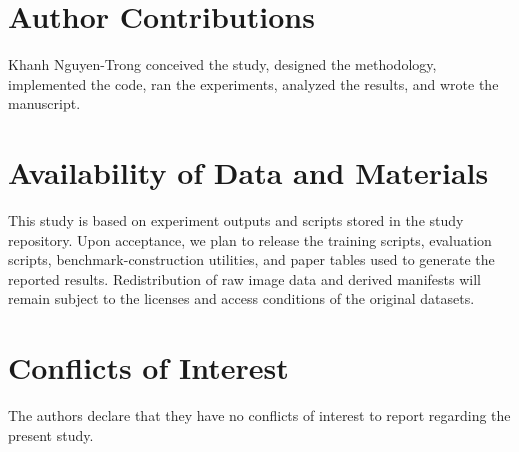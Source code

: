 \documentclass[10pt,a4paper]{article}
\begin{document}
\section*{Author Contributions}
Khanh Nguyen-Trong conceived the study, designed the methodology, implemented the code, ran the experiments, analyzed the results, and wrote the manuscript.

\section*{Availability of Data and Materials}
This study is based on experiment outputs and scripts stored in the study repository. Upon acceptance, we plan to release the training scripts, evaluation scripts, benchmark-construction utilities, and paper tables used to generate the reported results. Redistribution of raw image data and derived manifests will remain subject to the licenses and access conditions of the original datasets.

\section*{Conflicts of Interest}
The authors declare that they have no conflicts of interest to report regarding the present study.



\end{document}

